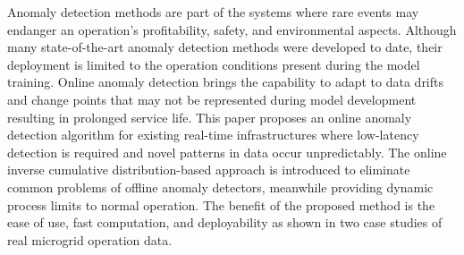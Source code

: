 Anomaly detection methods are part of the systems where rare events may endanger an operation's profitability, safety, and environmental aspects. Although many state-of-the-art anomaly detection methods were developed to date, their deployment is limited to the operation conditions present during the model training. Online anomaly detection brings the capability to adapt to data drifts and change points that may not be represented during model development resulting in prolonged service life. This paper proposes an online anomaly detection algorithm for existing real-time infrastructures where low-latency detection is required and novel patterns in data occur unpredictably. The online inverse cumulative distribution-based approach is introduced to eliminate common problems of offline anomaly detectors, meanwhile providing dynamic process limits to normal operation. The benefit of the proposed method is the ease of use, fast computation, and deployability as shown in two case studies of real microgrid operation data.
